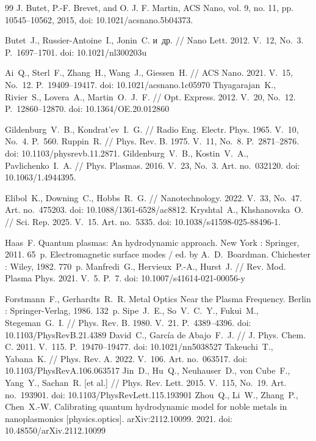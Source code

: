 \documentclass[12pt, a4paper]{article}
\begin{document}
\begin{thebibliography}{99}
J. Butet, P.-F. Brevet, and O. J. F. Martin, {ACS Nano}, vol. 9, no. 11, pp. 10545–10562, 2015, doi: 10.1021/acsnano.5b04373.

Butet~J., Russier-Antoine~I., Jonin~C. и~др. // Nano Lett. 2012. V.~12, No.~3. P.~1697--1701. doi: 10.1021/nl300203u

Ai~Q., Sterl~F., Zhang~H., Wang~J., Giessen~H. // ACS Nano. 2021. V.~15, No.~12. P.~19409--19417. doi: 10.1021/acsnano.1c05970
Thyagarajan~K., Rivier~S., Lovera~A., Martin~O.~J.~F. // Opt. Express. 2012. V.~20, No.~12. P.~12860--12870. doi: 10.1364/OE.20.012860

Gildenburg~V.~B., Kondrat’ev~I.~G. // Radio Eng. Electr. Phys. 1965. V.~10, No.~4. P.~560.
Ruppin~R. // Phys. Rev. B. 1975. V.~11, No.~8. P.~2871--2876. doi: 10.1103/physrevb.11.2871.
Gildenburg~V.~B., Kostin~V.~A., Pavlichenko~I.~A. // Phys. Plasmas. 2016. V.~23, No.~3. Art. no.~032120. doi: 10.1063/1.4944395.





Elibol~K., Downing~C., Hobbs~R.~G. // Nanotechnology. 2022. V.~33, No.~47. Art. no.~475203. doi: 10.1088/1361-6528/ac8812.
Kryshtal~A., Khshanovska~O. // Sci. Rep. 2025. V.~15. Art. no.~5335. doi: 10.1038/s41598-025-88496-1.

Haas~F. Quantum plasmas: An hydrodynamic approach. New York : Springer, 2011. 65~p.
Electromagnetic surface modes / ed. by A.~D.~Boardman. Chichester : Wiley, 1982. 770~p.
Manfredi~G., Hervieux~P.-A., Hurst~J. // Rev. Mod. Plasma Phys. 2021. V.~5. P.~7. 
doi: 10.1007/s41614-021-00056-y

Forstmann~F., Gerhardts~R.~R. Metal Optics Near the Plasma Frequency. Berlin : Springer-Verlag, 1986. 132~p.
Sipe~J.~E., So~V.~C.~Y., Fukui~M., Stegeman~G.~I. // Phys. Rev. B. 1980. V.~21. P.~4389--4396. doi: 10.1103/PhysRevB.21.4389
David~C., Garc\'{i}a de Abajo~F.~J. // J. Phys. Chem. C. 2011. V.~115. P.~19470--19477. doi: 10.1021/nn5038527
Takeuchi~T., Yabana~K. // Phys. Rev. A. 2022. V.~106. Art. no.~063517. doi: 10.1103/PhysRevA.106.063517
Jin~D., Hu~Q., Neuhauser~D., von Cube~F., Yang~Y., Sachan~R. [et al.] // Phys. Rev. Lett. 2015. V.~115, No.~19. Art. no.~193901. doi: 10.1103/PhysRevLett.115.193901
Zhou~Q., Li~W., Zhang~P., Chen~X.-W. Calibrating quantum hydrodynamic model for noble metals in nanoplasmonics [physics.optics]. arXiv:2112.10099. 2021. doi: 10.48550/arXiv.2112.10099


\end{thebibliography}
\end{document}
